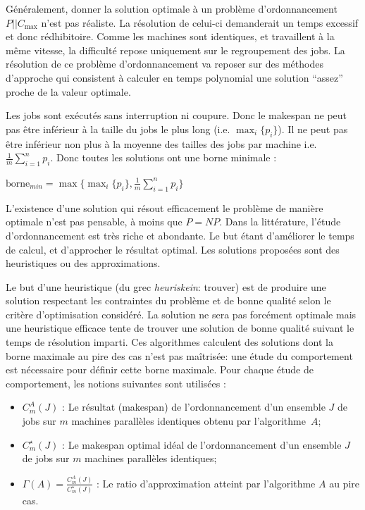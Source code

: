 \documentclass[a4paper,12pt]{report}
\theoremstyle{plain}				%
\theoremstyle{definition}				%
\newcommand\problemGrahamP{$P||C_{\max}$\xspace}
\newcommand{\jb}[1]{\todo[author=JB,color=orange,inline]{#1}}
\begin{document}
Généralement, donner la solution optimale à un problème d'ordonnancement \problemGrahamP n'est pas réaliste. %
La résolution de celui-ci demanderait un temps excessif et donc rédhibitoire.
Comme les machines sont identiques, et travaillent à la même vitesse, la difficulté repose uniquement 
  sur le regroupement des jobs.
La résolution de ce problème d'ordonnancement va reposer sur des méthodes d'approche qui consistent à 
  calculer en temps polynomial une solution ``assez'' proche de la valeur optimale.

Les jobs sont exécutés sans interruption ni coupure. Donc le makespan ne peut pas être inférieur à 
  la taille du jobs le plus long (i.e. $\max_i\{p_i\}$).
  Il ne peut pas être inférieur non plus à la moyenne des tailles des jobs par machine
  i.e. $\frac{1}{m} \sum_{i=1}^{n} p_i$.
Donc toutes les solutions ont une borne minimale \cite{mcnaughton1959scheduling}: \\

  \begin{center}
  $\text{borne}_{min} = \max \{ \max_i\{p_i\}, \frac{1}{m} \sum_{i=1}^{n} p_i \}$
  \label{borneMini}
  \end{center}

L'existence d'une solution qui résout efficacement le problème de manière optimale
  n'est pas pensable, à moins que $P = NP$.
Dans la littérature, l'étude d'ordonnancement est très riche et abondante. 
Le but étant d'améliorer le temps de calcul, et d'approcher le résultat optimal. 
Les solutions proposées sont des heuristiques ou des approximations.

Le but d'une heuristique (du grec \emph{heuriskein}: trouver) est 
  de produire une solution respectant les contraintes du problème et 
  de bonne qualité selon le critère d'optimisation considéré. 
La solution ne sera pas forcément optimale mais une heuristique efficace tente de trouver une 
  solution de bonne qualité suivant le temps de résolution imparti.
Ces algorithmes calculent des solutions dont la borne maximale au pire des cas n'est pas maîtrisée: 
une étude du comportement est nécessaire pour définir cette borne maximale.  
Pour chaque étude de comportement, les notions suivantes sont utilisées :

\begin{itemize}
	\item $C_m^A(J)$ : Le résultat (makespan) de l'ordonnancement
	d'un ensemble $J$ de jobs 
	sur $m$ machines parallèles identiques 
	obtenu par l'algorithme~$A$;

	\item $C_m^\star(J)$ : Le makespan optimal idéal de l'ordonnancement 
  	d'un ensemble $J$ de jobs 
	sur $m$ machines parallèles identiques;
	
	\item $\Gamma(A)=\frac{C_m^A(J)}{C_m^\star(J)}$ : Le ratio d'approximation 
	atteint par l'algorithme $A$ au pire cas.
	
\end{itemize}
   
\end{document}
